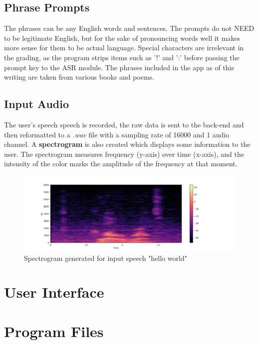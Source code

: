 \documentclass[12pt, letterpaper]{article}
\begin{document}
\subsection*{Phrase Prompts}
The phrases can be any English words and sentences. The prompts do not NEED to be legitimate English, but for the sake of pronouncing words well it makes more sense for them to be actual language. Special characters are irrelevant in the grading, as the program strips items such as '!' and ':' before passing the prompt key to the ASR module. The phrases included in the app as of this writing are taken from various books and poems. 

\subsection*{Input Audio}
The user's speech speech is recorded, the raw data is sent to the back-end and then reformatted to a \textit{.wav} file with a sampling rate of 16000 and 1 audio channel. A \textbf{spectrogram} is also created which displays some information to the user. The spectrogram measures frequency (y-axis) over time (x-axis), and the intensity of the color marks the amplitude of the frequency at that moment.

\begin{figure}[h!]
  \caption{Spectrogram generated for input speech "hello world"}
  \includegraphics[scale=0.5]{images/sample_spectrogram.png}
\end{figure}

\newpage%

\section*{User Interface}


\newpage%

\section*{Program Files}
\end{document}
